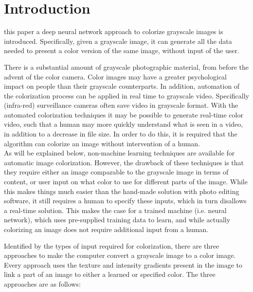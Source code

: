 \section{Introduction}\label{sec:intro}

%
%
%


 this paper a deep neural network approach to colorize grayscale images is introduced. Specifically, given a grayscale image, it can generate all the data needed to present a color version of the same image, without input of the user. 

There is a substantial amount of grayscale photographic material, from before the advent of the color camera. Color images may have a greater psychological impact on people than their grayscale counterparts.
In addition, automation of the colorization process can be applied in real time to grayscale video. Specifically (infra-red) surveillance cameras often save video in grayscale format. With the automated colorization techniques it may be possible to generate real-time color video, such that a human may more quickly understand what is seen in a video, in addition to a decrease in file size. In order to do this, it is required that the algorithm can colorize an image without intervention of a human.\\

As will be explained below, non-machine learning techniques are available for automatic image colorization. However, the drawback of these techniques is that they require either an image comparable to the grayscale image in terms of content, or user input on what color to use for different parts of the image. 
While this makes things much easier than the hand-made solution with photo editing software, it still requires a human to specify these inputs, which in turn disallows a real-time solution. This makes the case for a trained machine (i.e. neural network), which uses pre-supplied training data to learn, and while actually colorizing an image does not require additional input from a human.

Identified by the types of input required for colorization, there are three approaches to make the computer convert a grayscale image to a color image. Every approach uses the texture and intensity gradients present in the image to link a part of an image to either a learned or specified color. The three approaches are as follows:

